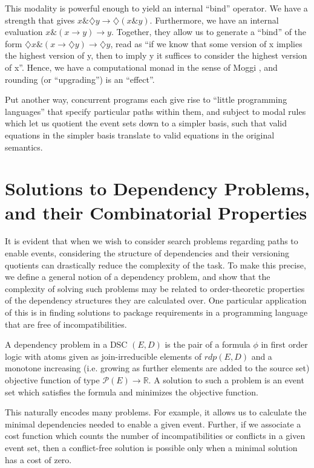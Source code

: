 \documentclass[a4paper,USenglish,cleveref, autoref, thm-restate,authorcolumns]{lipics-v2019}
\newcommand{\Pc}{\mathcal{P}}
\newcommand{\band}{\mathop{\&}}
\newcommand{\Dia}{\diamondsuit}
\begin{document}
This modality is powerful enough to yield an internal ``bind'' operator. We have a strength that gives \(x \band \Dia{y} \rightarrow \Dia(x \band y)\). Furthermore, we have an internal evaluation \(x \band (x \rightarrow y) \rightarrow y\). Together, they allow us to generate a ``bind'' of the form \(\Dia{x} \band (x \rightarrow \Dia{y}) \rightarrow \Dia{y}\), read as ``if we know that some version of x implies the highest version of y, then to imply y it suffices to consider the highest version of x''. Hence, we have a computational monad in the sense of Moggi \cite{moggi1991notions}, and rounding (or ``upgrading'') is an ``effect''. 

Put another way, concurrent programs each give rise to ``little programming languages'' that specify particular paths within them, and subject to modal rules which let us quotient the event sets down to a simpler basis, such that valid equations in the simpler basis translate to valid equations in the original semantics. 

\section{Solutions to Dependency Problems, and their Combinatorial Properties}
It is evident that when we wish to consider search problems regarding paths to enable events, considering the structure of dependencies and their versioning quotients can drastically reduce the complexity of the task. To make this precise, we define a general notion of a dependency problem, and show that the complexity of solving such problems may be related to order-theoretic properties of the dependency structures they are calculated over. One particular application of this is in finding solutions to package requirements in a programming language that are free of incompatibilities.

\begin{definition}
A dependency problem in a DSC \((E,D)\) is the pair of a formula \(\phi\) in first order logic with atoms given as join-irreducible elements of \(rdp(E,D)\) and a monotone increasing (i.e. growing as further elements are added to the source set) objective function of type \(\Pc(E) \rightarrow \mathbb{R}\). A solution to such a problem is an event set which satisfies the formula and minimizes the objective function.
\end{definition}

This naturally encodes many problems. For example, it allows us to calculate the minimal dependencies needed to enable a given event. Further, if we associate a cost function which counts the number of incompatibilities or conflicts in a given event set, then a conflict-free solution is possible only when a minimal solution has a cost of zero.
\end{document}
